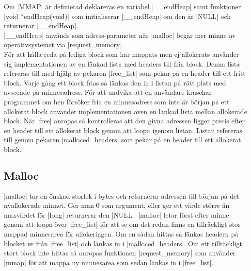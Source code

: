 \documentclass[paper=a4, fontsize=11pt]{scrartcl} %
\numberwithin{equation}{section} %
\numberwithin{figure}{section} %
\numberwithin{table}{section} %
\begin{document}
%
%
Om |MMAP| är definierad deklareras en variabel |__endHeap| samt funktionen 
|void *endHeap(void)| som initialiserar |__endHeap| om den är |NULL| och
returnerar |__endHeap|.\\

|__endHeap| används som adress-parameter när |malloc| begär mer minne av
operativsystemet via |request_memory|.\\

För att hålla reda på lediga block som har mappats men ej allokerats använder
sig implementationen av en länkad lista med headers till fria block.
Denna lista refereras till med hjälp av pekaren |free_list| som pekar på en
header till ett fritt block.
Varje gång ett block frias så länkas den in i listan på rätt plats med avseende
på minnesadress.
För att undvika att en användare kraschar programmet om hen försöker fria en
minnesadress som inte är början på ett allokerat block använder
implementationen även en länkad lista mellan allokerade block.
När |free| anropas så kontrolleras att den givna adressen ligger precis efter
en header till ett allokerat block genom att loopa igenom listan.
Listan refereras till genom pekaren |malloced_headers| som pekar på en header
till ett allokerat block.

\subsection{Malloc}
|malloc| tar en önskad storlek i bytes och returnerar adressen till början på
det nyallokerade minnet.
Ger man 0 som argument, eller ger ett värde större än maxvärdet för |long|
returnerar den |NULL|.
|malloc| letar först efter minne genom att loopa över |free_list| för att se om
det redan finns en tillräckligt stor mappad minnesarea för allokeringen.
Om en sådan hittas så länkas headern på blocket ur från |free_list| och länkas
in i |malloced_headers|.
Om ett tillräckligt stort block inte hittas så anropas funktionen
|request_memory| som använder |mmap| för att mappa ny minnesarea som sedan
länkas in i |free_list|.
\end{document}
